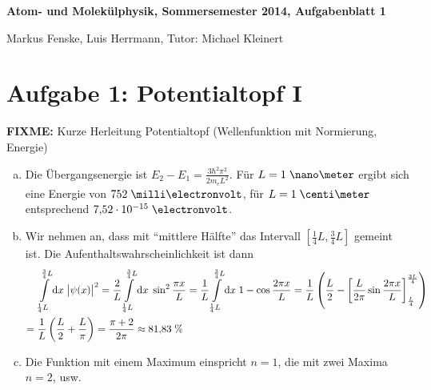 \documentclass[a4paper,german,12pt,smallheadings]{scrartcl}
\begin{document}
\allowdisplaybreaks %
\begin{center}
\bfseries %
\sffamily %
\vspace{-40pt}
Atom- und Molekülphysik, Sommersemester 2014, Aufgabenblatt 1

Markus Fenske, Luis Herrmann, Tutor: Michael Kleinert
\vspace{-10pt}
\end{center}
\section*{Aufgabe 1: Potentialtopf I}

\textbf{FIXME:} Kurze Herleitung Potentialtopf (Wellenfunktion mit Normierung, Energie)

\begin{enumerate}[a)]
  \item
    Die Übergangsenergie ist $E_2 - E_1 = \frac{3 \hbar^2 \pi^2}{2 m_e L^2}$.
    Für $L = 1 \; \nano\meter$ ergibt sich eine Energie von $752 \;
    \milli\electronvolt$, für $L = 1 \; \centi\meter$ entsprechend $7{,}52 \cdot
    10^{-15} \;\electronvolt$.
  \item
    Wir nehmen an, dass mit ``mittlere Hälfte'' das Intervall $[\frac{1}{4} L,
    \frac{3}{4} L]$ gemeint ist. Die Aufenthaltswahrscheinlichkeit ist dann
    \begin{align}
        &\int\limits_{\frac{1}{4} L}^{\frac{3}{4} L} \dif x\; \envert{\psi(x)}^2
      =  \frac{2}{L} \int\limits_{\frac{1}{4} L}^{\frac{3}{4} L} \dif x\; \sin^2 \frac{\pi x}{L}
      =  \frac{1}{L} \int\limits_{\frac{1}{4} L}^{\frac{3}{4} L} \dif x\; 1 - \cos \frac{2 \pi x}{L}
      =  \frac{1}{L} \del{ \frac{L}{2} - \sbr{\frac{L}{2 \pi} \sin \frac{2 \pi x}{L}}_{\frac{L}{4}}^{\frac{3L}{4}} } \\
      = \;&\frac{1}{L} \del{\frac{L}{2} + \frac{L}{\pi}}
      = \frac{\pi + 2}{2 \pi}
      \approx 81{,}83 \; \%
    \end{align}
  \item
    Die Funktion mit einem Maximum einspricht $n=1$, die mit zwei Maxima $n=2$, usw.

\end{enumerate}
\end{document}
